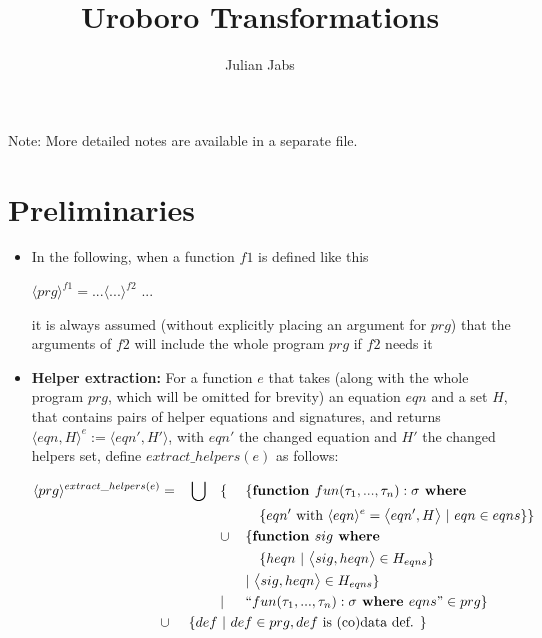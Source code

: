 \documentclass[11pt]{article} %
\title{Uroboro Transformations}
\author{Julian Jabs}
\begin{document}
\maketitle

Note: More detailed notes are available in a separate file.

\section{Preliminaries}

\begin{itemize}

\item In the following, when a function $f1$ is defined like this

$\langle prg \rangle^{f1} = ... \langle ... \rangle^{f2}$ ...

it is always assumed (without explicitly placing an argument for $prg$) that the arguments of $f2$ will include the whole program $prg$ if $f2$ needs it

\item \textbf{Helper extraction:} For a function $e$ that takes (along with the whole program $prg$, which will be omitted for brevity) an equation $eqn$ and a set $H$, that contains pairs of helper equations and signatures, and returns $\langle eqn, H \rangle^e := \big\langle eqn', H' \big\rangle$, with $eqn'$ the changed equation and $H'$ the changed helpers set, define $extract\_helpers(e)$ as follows:

\begin{alignat*}{4}
\langle prg \rangle^{extract\_helpers(e)} & = &&\bigcup &&\{ ~&&\{ \textrm{\textbf{function }} fun(\tau_1, ..., \tau_n): \sigma \textrm{\textbf{ where }} \\
& && && &&\quad \{ eqn' \textrm{ with } \langle eqn \rangle^{e} = \big\langle eqn', H \big\rangle ~ | ~ eqn \in eqns \} \} \\
& && && \cup && \{ \textrm{\textbf{function }} sig \textrm{\textbf{ where }} \\
& && && &&\quad \{ heqn ~ | ~ \big\langle sig, heqn \big\rangle \in H_{eqns} \} \\
& && && && | ~  \big\langle sig, heqn \big\rangle \in H_{eqns} \} \\
& && && | && `` fun (\tau_1, ..., \tau_n): \sigma \textrm{\textbf{ where }} eqns " \in prg \} \\
& \cup && \{ def ~ | ~ def \in prg, def \textrm{ is (co)data def. } \} \span\span\span\span
\end{alignat*}


\end{itemize}
\end{document}
